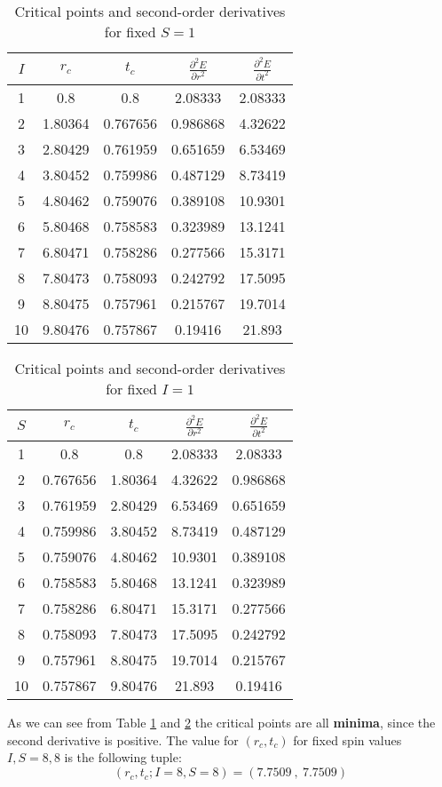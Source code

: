 \documentclass[a4paper]{article}
\begin{document}
\begin{table}[h]
    \centering
    \begin{tabular}{ccccc}
        \toprule
        $I$ & $r_c$ & $t_c$ & $\frac{\partial^2 E}{\partial r^2}$ & $\frac{\partial^2 E}{\partial t^2}$ \\
        \midrule
        1  & 0.8     & 0.8     & 2.08333  & 2.08333  \\
        2  & 1.80364 & 0.767656 & 0.986868  & 4.32622  \\
        3  & 2.80429 & 0.761959 & 0.651659  & 6.53469  \\
        4  & 3.80452 & 0.759986 & 0.487129  & 8.73419  \\
        5  & 4.80462 & 0.759076 & 0.389108  & 10.9301  \\
        6  & 5.80468 & 0.758583 & 0.323989  & 13.1241  \\
        7  & 6.80471 & 0.758286 & 0.277566  & 15.3171  \\
        8  & 7.80473 & 0.758093 & 0.242792  & 17.5095  \\
        9  & 8.80475 & 0.757961 & 0.215767  & 19.7014  \\
        10 & 9.80476 & 0.757867 & 0.19416  & 21.893  \\
        \bottomrule
    \end{tabular}
    \caption{Critical points and second-order derivatives for fixed $S=1$}
    \label{table1}
\end{table}

\begin{table}[h]
    \centering
    \begin{tabular}{ccccc}
        \toprule
        $S$ & $r_c$ & $t_c$ & $\frac{\partial^2 E}{\partial r^2}$ & $\frac{\partial^2 E}{\partial t^2}$ \\
        \midrule
        1  & 0.8     & 0.8     & 2.08333  & 2.08333  \\
        2  & 0.767656 & 1.80364 & 4.32622  & 0.986868  \\
        3  & 0.761959 & 2.80429 & 6.53469  & 0.651659  \\
        4  & 0.759986 & 3.80452 & 8.73419  & 0.487129  \\
        5  & 0.759076 & 4.80462 & 10.9301  & 0.389108  \\
        6  & 0.758583 & 5.80468 & 13.1241  & 0.323989  \\
        7  & 0.758286 & 6.80471 & 15.3171  & 0.277566  \\
        8  & 0.758093 & 7.80473 & 17.5095  & 0.242792  \\
        9  & 0.757961 & 8.80475 & 19.7014  & 0.215767  \\
        10 & 0.757867 & 9.80476 & 21.893  & 0.19416  \\
        \bottomrule
    \end{tabular}
    \caption{Critical points and second-order derivatives for fixed $I=1$}
    \label{table2}
\end{table}

As we can see from Table \ref{table1} and \ref{table2} the critical points are all \textbf{minima}, since the second derivative is positive. The value for $(r_c, t_c)$ for fixed spin values $I,S=8, 8$ is the following tuple:
$$(r_c, t_c;I=8,S=8)=(7.7509\ ,\ 7.7509)$$
\end{document}
